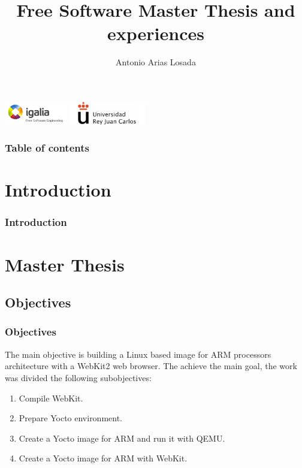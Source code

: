 \documentclass[slidestop,compress,mathserif]{beamer}
\title[Master Thesis and experiences]
{Free Software Master Thesis and experiences}
\author[Autores abreviados]{Antonio Arias Losada}
\institute{Free Software Master - 2011/2012}
\begin{document}
\begin{frame}
\titlepage
\begin{center}
\includegraphics[height=1cm]{images/igalia.png}
\hspace{10mm}
\includegraphics[height=1cm]{images/urjc.png}
\end{center}
\end{frame}

\begin{frame}
\frametitle{Table of contents}

\tableofcontents[hideallsubsections]
\end{frame}


\section{Introduction}
\begin{frame}
\frametitle{Introduction}

\end{frame}

\section{Master Thesis}
\subsection{Objectives}
\begin{frame}
\frametitle{Objectives}

The main objective is building a Linux based image for ARM processors architecture with a WebKit2 web browser.
The achieve the main goal, the work was divided the following subobjectives:

\vspace{5mm}

\begin{enumerate}
\item<1-> Compile WebKit.
\item<2-> Prepare Yocto environment.
\item<3-> Create a Yocto image for ARM and run it with QEMU.
\item<4-> Create a Yocto image for ARM with WebKit.
\end{enumerate}

\end{frame}
\end{document}
